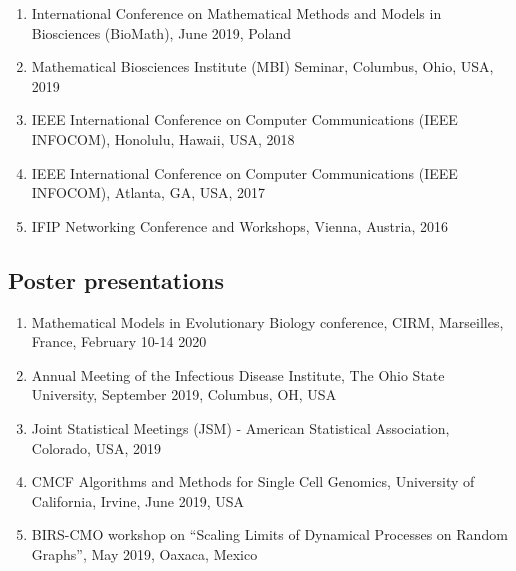 \documentclass[11pt,a4paper,sans]{moderncv}        %
\begin{document}
\begin{enumerate}
	\item{International Conference on Mathematical Methods and Models in Biosciences (BioMath), June 2019, Poland}
	\item{Mathematical Biosciences Institute (MBI) Seminar, Columbus, Ohio, USA, 2019}
	\item{IEEE International Conference on Computer Communications (IEEE INFOCOM), Honolulu, Hawaii, USA, 2018}
	\item{IEEE International Conference on Computer Communications (IEEE INFOCOM), Atlanta, GA, USA, 2017}
	\item{IFIP Networking Conference  and Workshops, Vienna, Austria, 2016}
\end{enumerate}




\subsection{Poster presentations}
\begin{enumerate}
	\item {Mathematical Models in Evolutionary Biology conference, CIRM, Marseilles, France, February 10-14 2020}
	\item{Annual Meeting of the Infectious Disease Institute, The Ohio State University, September 2019, Columbus, OH, USA}
	\item{Joint Statistical Meetings (JSM) - American Statistical Association, Colorado, USA, 2019} 
	\item {CMCF Algorithms and Methods for Single Cell Genomics, University of California, Irvine, June 2019, USA}
	\item {BIRS-CMO workshop on ``Scaling Limits of Dynamical Processes on Random Graphs'', May 2019, Oaxaca, Mexico}
\end{enumerate}
\end{document}
